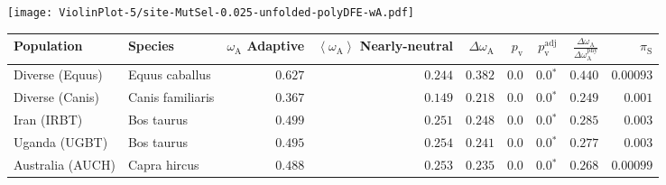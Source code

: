 \begin{center}
\texttt{[image: ViolinPlot-5/site-MutSel-0.025-unfolded-polyDFE-wA.pdf]} 
\begin{adjustbox}{width = 1\textwidth}
\begin{tabular}{|l|l|r|r|r|r|r|r|r|}
\toprule
                     Population &              Species & \specialcell{$\omega_{\mathrm{A}}$ \\ Adaptive} & \specialcell{$\left< \omega_{\mathrm{A}} \right>$ \\ Nearly-neutral} & $\Delta \omega_{\mathrm{A}} $ & $p_{\mathrm{v}}$ & $p_{\mathrm{v}}^{\mathrm{adj}}$ & $\frac{\Delta\omega_{\mathrm{A}}}{\Delta\omega_{\mathrm{A}}^{\mathrm{phy}}}$ & $\pi_{\textrm{S}}$ \\
\midrule
                Diverse (Equus) &       Equus caballus &                                        $ 0.627$ &                                           $ 0.244$ &                      $ 0.382$ &            $0.0$ &                  $\bm{0.0{^*}}$ &                                           $ 0.440$ &          $0.00093$ \\
                Diverse (Canis) &     Canis familiaris &                                        $ 0.367$ &                                           $ 0.149$ &                      $ 0.218$ &            $0.0$ &                  $\bm{0.0{^*}}$ &                                           $ 0.249$ &           $ 0.001$ \\
                    Iran (IRBT) &           Bos taurus &                                        $ 0.499$ &                                           $ 0.251$ &                      $ 0.248$ &            $0.0$ &                  $\bm{0.0{^*}}$ &                                           $ 0.285$ &           $ 0.003$ \\
                  Uganda (UGBT) &           Bos taurus &                                        $ 0.495$ &                                           $ 0.254$ &                      $ 0.241$ &            $0.0$ &                  $\bm{0.0{^*}}$ &                                           $ 0.277$ &           $ 0.003$ \\
               Australia (AUCH) &         Capra hircus &                                        $ 0.488$ &                                           $ 0.253$ &                      $ 0.235$ &            $0.0$ &                  $\bm{0.0{^*}}$ &                                           $ 0.268$ &          $0.00099$ \\

\end{tabular}
\end{adjustbox}
\end{center}
